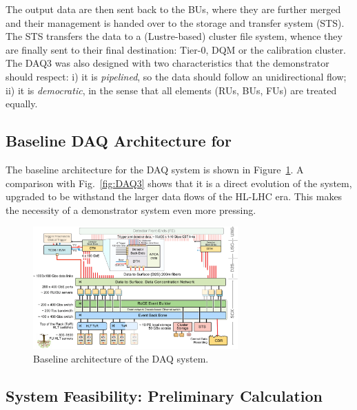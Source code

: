 The output data are then sent back to the BUs, where they are further merged and their management is handed over to the storage and transfer system (STS).
The STS  transfers the data to a (Lustre-based) cluster file system, whence they are finally sent to their final destination:
Tier-0,
DQM
or the calibration cluster.
The DAQ3 was also designed with two characteristics that the demonstrator should respect: 
i) it is \emph{pipelined}, so the data should follow an unidirectional flow;
ii) it is \emph{democratic}, in the sense that all elements (RUs, BUs, FUs) are treated equally.


\subsection{Baseline DAQ Architecture for \Phasetwo}

The baseline architecture for  the \Phasetwo DAQ system is shown in Figure~\ref{fig:DAQP2}.
A comparison with Fig.~\ref{fig:DAQ3} shows that it is a direct evolution of the \Runtwo system,
upgraded to be withstand the larger data flows of the HL-LHC era.
This makes the necessity of a demonstrator system even more pressing.

\begin{figure}[htbp]
   \centering
	\includegraphics[width=0.7\textwidth]{figures/Phase2-Layout-1-20210913.pdf}
  \caption{Baseline architecture of the \Phasetwo DAQ system.}
   \label{fig:DAQP2}
\end{figure}


\subsection{System Feasibility: Preliminary Calculation}

